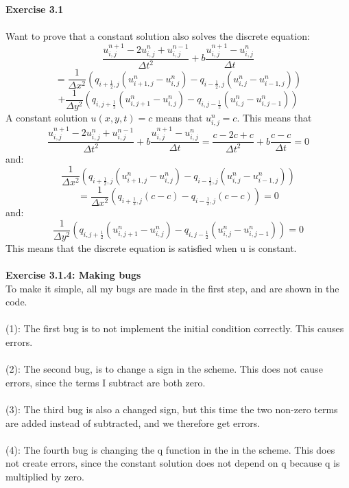 \documentclass[11pt,a4paper]{report}
\begin{document}
\\
\\
\\
\\
\\
\textbf{Exercise 3.1}
\\
\\
Want to prove that a constant solution also solves the discrete equation: $$ \frac{u_{i,j}^{n+1}-2u_{i,j}^n+u_{i,j}^{n-1}}{\Delta t^2} + b\frac{u_{i,j}^{n+1}-u_{i,j}^n}{\Delta t} $$ $$ = \frac{1}{\Delta x^2}(q_{i+\frac{1}{2},j}(u_{i+1,j}^{n}-u_{i,j}^{n})-q_{i-\frac{1}{2},j}(u_{i,j}^{n}-u_{i-1,j}^{n}))$$ $$ +\frac{1}{\Delta y^2}(q_{i,j+\frac{1}{2}}(u_{i,j+1}^{n}-u_{i,j}^{n})-q_{i,j-\frac{1}{2}}(u_{i,j}^{n}-u_{i,j-1}^{n}))$$ A constant solution $u(x,y,t)=c$ means that $u_{i,j}^n=c$. This means that $$ \frac{u_{i,j}^{n+1}-2u_{i,j}^n+u_{i,j}^{n-1}}{\Delta t^2} + b\frac{u_{i,j}^{n+1}-u_{i,j}^n}{\Delta t} = \frac{c-2c+c}{\Delta t^2} + b\frac{c-c}{\Delta t} = 0$$ and: $$ \frac{1}{\Delta x^2}(q_{i+\frac{1}{2},j}(u_{i+1,j}^{n}-u_{i,j}^{n})-q_{i-\frac{1}{2},j}(u_{i,j}^{n}-u_{i-1,j}^{n}))$$ $$ = \frac{1}{\Delta x^2}(q_{i+\frac{1}{2},j}(c-c)-q_{i-\frac{1}{2},j}(c-c))=0$$ and: $$ \frac{1}{\Delta y^2}(q_{i,j+\frac{1}{2}}(u_{i,j+1}^{n}-u_{i,j}^{n})-q_{i,j-\frac{1}{2}}(u_{i,j}^{n}-u_{i,j-1}^{n}))=0$$ This means that the discrete equation is satisfied when u is constant.
\\
\\
\textbf{Exercise 3.1.4: Making bugs}
\\
To make it simple, all my bugs are made in the first step, and are shown in the code. 
\\
\\
(1): The first bug is to not implement the initial condition correctly. This causes errors.
\\
\\
(2): The second bug, is to change a sign in the scheme. This does not cause errors, since the terms I subtract are both zero.
\\
\\
(3): The third bug is also a changed sign, but this time the two non-zero terms are added instead of subtracted, and we therefore get errors.
\\
\\
(4): The fourth bug is changing the q function in the in the scheme. This does not create errors, since the constant solution does not depend on q because q is multiplied by zero.
\\
\\
\end{document}
